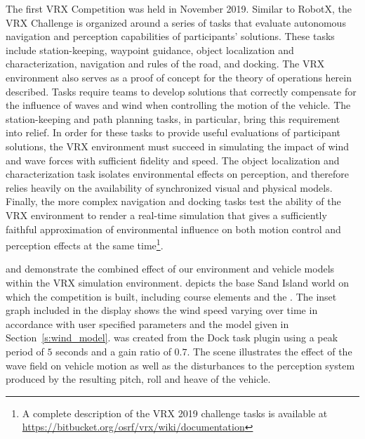 \documentclass[utf8]{frontiersSCNS} %
\begin{document}
The first VRX Competition was held in November 2019. Similar to RobotX, the VRX Challenge is organized around a series of tasks that evaluate autonomous navigation and perception capabilities of participants' solutions.  These tasks include station-keeping, waypoint guidance, object localization and characterization, navigation and rules of the road, and docking.  The VRX environment also serves as a proof of concept for the theory of operations herein described. Tasks require teams to develop solutions that correctly compensate for the influence of waves and wind when controlling the motion of the vehicle. The station-keeping and path planning tasks, in particular, bring this requirement into relief.  In order for these tasks to provide useful evaluations of participant solutions, the VRX environment must succeed in simulating the impact of wind and wave forces with sufficient fidelity and speed.  The object localization and characterization task isolates environmental effects on perception, and therefore relies heavily on the availability of synchronized visual and physical models. Finally, the more complex navigation and docking tasks test the ability of the VRX environment to render a real-time simulation that gives a sufficiently faithful approximation of environmental influence on both motion control and perception effects at the same time\footnote{A complete description of the VRX 2019 challenge tasks is available at \url{https://bitbucket.org/osrf/vrx/wiki/documentation}}.    

 and  demonstrate the combined effect of our environment and vehicle models within the VRX simulation environment.  depicts the base Sand Island world on which the competition is built, including course elements and the \wamv{}. The inset graph included in the display shows the wind speed varying over time in accordance with user specified parameters and the model given in Section~\ref{s:wind_model}.  was created from the Dock task plugin using a peak period of $5$ seconds and a gain ratio of $0.7$. The scene illustrates the effect of the wave field on vehicle motion as well as the disturbances to the perception system produced by the resulting pitch, roll and heave of the vehicle.  
\end{document}

